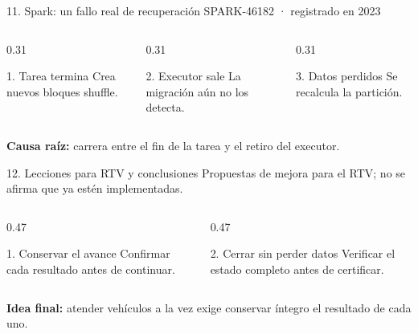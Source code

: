 \begin{frame}{11. Spark: un fallo real de recuperación}
  {\small\color{textoSuave}SPARK-46182 · registrado en 2023\,\cite{spark46182}}\par
  \vspace{0.55cm}
  \begin{columns}[T,onlytextwidth]
    \begin{column}{0.31\textwidth}
      \begin{block}{1. Tarea termina}
        Crea nuevos bloques shuffle.\,\cite{spark46182}
      \end{block}
    \end{column}
    \begin{column}{0.31\textwidth}
      \begin{block}{2. Executor sale}
        La migración aún no los detecta.\,\cite{spark46182}
      \end{block}
    \end{column}
    \begin{column}{0.31\textwidth}
      \begin{block}{3. Datos perdidos}
        Se recalcula la partición.\,\cite{spark46182}
      \end{block}
    \end{column}
  \end{columns}
  \vspace{0.55cm}
  {\small\bfseries Causa raíz:} carrera entre el fin de la tarea y el retiro del executor.\,\cite{spark46182}
\end{frame}

\begin{frame}{12. Lecciones para RTV y conclusiones}
  \vspace{0.28cm}
  {\small\color{textoSuave}Propuestas de mejora para el RTV; no se afirma que ya estén implementadas.}\par
  \vspace{0.55cm}
  \begin{columns}[T,onlytextwidth]
    \begin{column}{0.47\textwidth}
      \begin{block}{1. Conservar el avance}
        Confirmar cada resultado antes de continuar.\,\cite{postgresTransactions}
      \end{block}
    \end{column}
    \begin{column}{0.47\textwidth}
      \begin{block}{2. Cerrar sin perder datos}
        Verificar el estado completo antes de certificar.\,\cite{spark46182,postgresTransactions}
      \end{block}
    \end{column}
  \end{columns}
  \vspace{0.60cm}
  {\small\bfseries Idea final:} atender vehículos a la vez exige conservar íntegro el resultado de cada uno.\,\cite{spark46182,postgresTransactions}
\end{frame}

